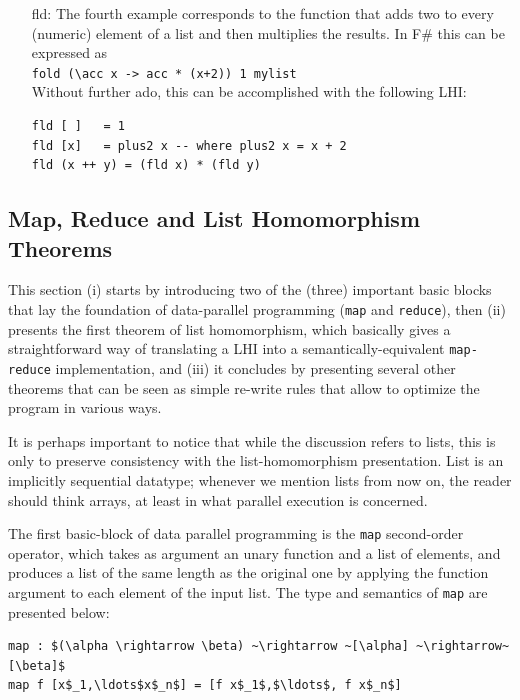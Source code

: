 \documentclass[acmsmall,review]{acmart}\settopmatter{printfolios=true,printccs=false,printacmref=false}
\begin{document}
\begin{itemize}
\item[fld:] The fourth example corresponds to the function that adds two
            to every (numeric) element of a list and then multiplies the results.
            In F\# this can be expressed as\\ 
            \lstinline{fold (\acc x -> acc * (x+2)) 1 mylist}\\
            Without further ado, this can be accomplished with the following LHI:
\begin{lstlisting}[mathescape=true]
fld [ ]   = 1
fld [x]   = plus2 x -- where plus2 x = x + 2
fld (x ++ y) = (fld x) * (fld y)
\end{lstlisting}\vspace{-2ex}
\end{itemize} 


\subsection{Map, Reduce and List Homomorphism Theorems}

This section (i) starts by introducing two of the (three) important 
basic blocks that lay the foundation of data-parallel programming
(\lstinline{map} and \lstinline{reduce}),
then (ii) presents the first theorem of list homomorphism, which 
basically gives a straightforward way of translating a LHI into
a semantically-equivalent \lstinline{map-reduce} implementation,
and (iii) it concludes by presenting several other theorems that
can be seen as simple re-write rules that allow to optimize the 
program in various ways.

It is perhaps important to notice that while the discussion refers
to lists, this is only to preserve consistency with the
list-homomorphism presentation. List is an implicitly sequential 
datatype; whenever we mention lists from now on, the reader
should think arrays, at least in what parallel execution is concerned. 

The first basic-block of data parallel programming is the 
\lstinline{map} second-order operator, which takes as argument 
an unary function and a list of elements, and produces a list 
of the same length as the original one by applying the function 
argument to each element of the input list.  
The type and semantics of \lstinline{map} are presented below:
\begin{lstlisting}[mathescape=true]
map : $(\alpha \rightarrow \beta) ~\rightarrow ~[\alpha] ~\rightarrow~ [\beta]$
map f [x$_1,\ldots$x$_n$] = [f x$_1$,$\ldots$, f x$_n$]
\end{lstlisting}\vspace{-2ex}
\end{document}
